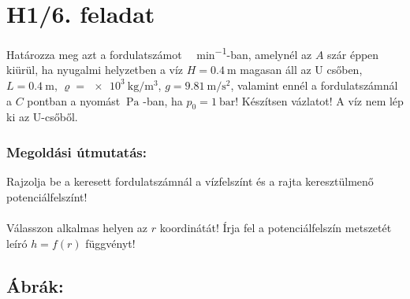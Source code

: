\section*{H1/6. feladat}

Határozza meg azt a fordulatszámot \SI{}{\1\per\minute}-ban, amelynél az $A$ szár éppen kiürül, ha nyugalmi helyzetben a víz $H = \SI{0,4}{\meter}$ magasan áll az U csőben, $L = \SI{0,4}{\meter}$, $\varrho = \SI{e3}{\kilogram\per\meter\cubed}$, $g = \SI{9,81}{\meter\per\second\squared}$, valamint ennél a fordulatszámnál a $C$ pontban a nyomást $\SI{}{\pascal}$ -ban, ha $p_0 = \SI{1}{\bar}$! Készítsen vázlatot! A víz nem lép ki az U-csőből.

\subsubsection* {Megoldási útmutatás:}
\vspace{2mm}
Rajzolja be a keresett fordulatszámnál a vízfelszínt és a rajta keresztülmenő potenciálfelszínt!
\\ \\
Válasszon alkalmas helyen az $r$ koordinátát! Írja fel a potenciálfelszín metszetét leíró $h= f(r)$ függvényt!

\subsection{Ábrák:}

